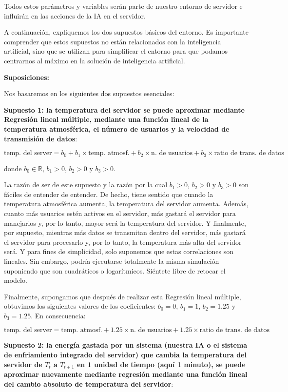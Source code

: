 \documentclass[]{book}
\begin{document}
Todos estos parámetros y variables serán parte de nuestro entorno de servidor e influirán en las acciones de la IA en el servidor.

A continuación, expliquemos los dos supuestos básicos del entorno. Es importante comprender que estos supuestos no están relacionados con la inteligencia artificial, sino que se utilizan para simplificar el entorno para que podamos centrarnos al máximo en la solución de inteligencia artificial.

\textbf{Suposiciones:}

Nos basaremos en los siguientes dos supuestos esenciales:

\textbf{Supuesto 1: la temperatura del servidor se puede aproximar mediante Regresión lineal múltiple, mediante una función lineal de la temperatura atmosférica, el número de usuarios y la velocidad de transmisión de datos}:

\[\textrm{temp. del server} = b_0 + b_1 \times \textrm{temp. atmosf.} + b_2 \times \textrm{n. de usuarios} + b_3 \times \textrm{ratio de trans. de datos} \]

donde \(b_0 \in \mathbb{R}\), \(b_1>0\), \(b_2>0\) y \(b_3>0\).

La razón de ser de este supuesto y la razón por la cual \(b_1>0\), \(b_2>0\) y \(b_3>0\) son fáciles de entender de entender. De hecho, tiene sentido que cuando la temperatura atmosférica aumenta, la temperatura del servidor aumenta. Además, cuanto más usuarios estén activos en el servidor, más gastará el servidor para manejarlos y, por lo tanto, mayor será la temperatura del servidor. Y finalmente, por supuesto, mientras más datos se transmitan dentro del servidor, más gastará el servidor para procesarlo y, por lo tanto, la temperatura más alta del servidor será. Y para fines de simplicidad, solo suponemos que estas correlaciones son lineales. Sin embargo, podría ejecutarse totalmente la misma simulación suponiendo que son cuadráticos o logarítmicos. Siéntete libre de retocar el modelo.

Finalmente, supongamos que después de realizar esta Regresión lineal múltiple, obtuvimos los siguientes valores de los coeficientes: \(b_0 = 0\), \(b_1 = 1\), \(b_2 = 1.25\) y \(b_3 = 1.25\). En consecuencia:

\[\textrm{temp. del server} = \textrm{temp. atmosf.} + 1.25 \times \textrm{n. de usuarios} + 1.25 \times \textrm{ratio de trans. de datos} \]

\textbf{Supuesto 2: la energía gastada por un sistema (nuestra IA o el sistema de enfriamiento integrado del servidor) que cambia la temperatura del servidor de \(T_t\) a \(T_{t + 1}\) en 1 unidad de tiempo (aquí 1 minuto), se puede aproximar nuevamente mediante regresión mediante una función lineal del cambio absoluto de temperatura del servidor}:
\end{document}

